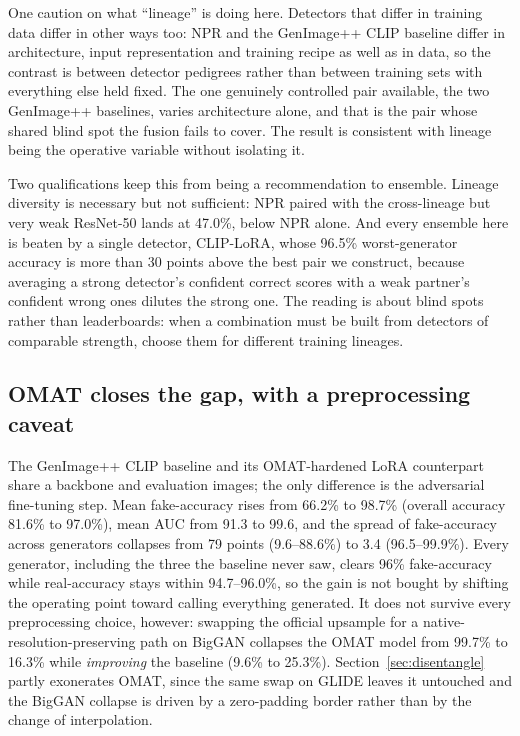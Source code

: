 \documentclass[3p,times,procedia]{elsarticle}
\begin{document}
One caution on what ``lineage'' is doing here. Detectors that differ in
training data differ in other ways too: NPR and the GenImage++ CLIP
baseline differ in architecture, input representation and training recipe
as well as in data, so the contrast is between detector pedigrees rather
than between training sets with everything else held fixed. The one
genuinely controlled pair available, the two GenImage++ baselines, varies
architecture alone, and that is the pair whose shared blind spot the
fusion fails to cover. The result is consistent with lineage being the
operative variable without isolating it.

Two qualifications keep this from being a recommendation to ensemble.
Lineage diversity is necessary but not sufficient: NPR paired with the
cross-lineage but very weak ResNet-50 lands at 47.0\%, below NPR alone.
And every ensemble here is beaten by a single detector, CLIP-LoRA, whose
96.5\% worst-generator accuracy is more than 30 points above the best pair
we construct, because averaging a strong detector's confident correct
scores with a weak partner's confident wrong ones dilutes the strong one.
The reading is about blind spots rather than leaderboards: when a
combination must be built from detectors of comparable strength, choose
them for different training lineages.

\subsection{OMAT closes the gap, with a preprocessing caveat}
\label{sec:finding2}

The GenImage++ CLIP baseline and its OMAT-hardened LoRA counterpart share
a backbone and evaluation images; the only difference is the adversarial
fine-tuning step. Mean fake-accuracy rises from 66.2\% to 98.7\% (overall
accuracy 81.6\% to 97.0\%), mean AUC from 91.3 to 99.6, and the spread of
fake-accuracy across generators collapses from 79 points (9.6--88.6\%) to
3.4 (96.5--99.9\%). Every generator, including the three the baseline
never saw, clears 96\% fake-accuracy while real-accuracy stays within
94.7--96.0\%, so the gain is not bought by shifting the operating point
toward calling everything generated. It does not survive every
preprocessing choice, however: swapping the official upsample for a
native-resolution-preserving path on BigGAN collapses the OMAT model from
99.7\% to 16.3\% while \emph{improving} the baseline (9.6\% to 25.3\%).
Section~\ref{sec:disentangle} partly exonerates OMAT, since the same swap
on GLIDE leaves it untouched and the BigGAN collapse is driven by a
zero-padding border rather than by the change of interpolation.
\end{document}
